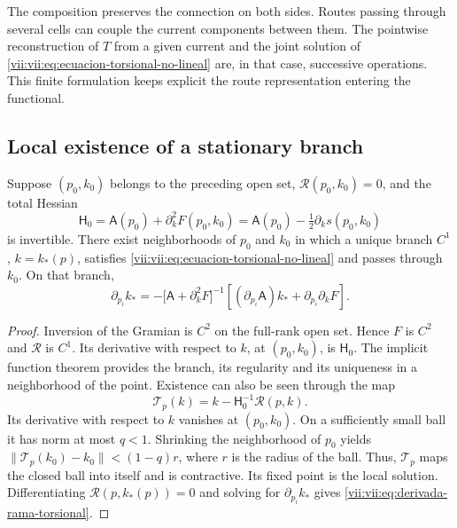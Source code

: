 The composition preserves the connection on both sides. Routes
passing through several cells can couple the current
components between them. The pointwise reconstruction of \(T\) from
a given current and the joint solution of
\eqref{vii:vii:eq:ecuacion-torsional-no-lineal} are, in that case,
successive operations. This finite formulation keeps explicit
the route representation entering the functional.

\subsection{Local existence of a stationary branch}
\label{vii:vii:subsec:rama-torsional-local}

\begin{theorem}
\label{vii:vii:thm:rama-torsional-local}
Suppose \((p_0,k_0)\) belongs to the preceding open set,
\(\mathcal R(p_0,k_0)=0\), and the total Hessian
\begin{equation}
 \mathsf H_0
 =\mathsf A(p_0)+\partial_k^2F(p_0,k_0)
 =\mathsf A(p_0)-\tfrac12\partial_ks(p_0,k_0)
 \label{vii:vii:eq:hessiano-total-torsional}
\end{equation}
is invertible. There exist neighborhoods of \(p_0\) and \(k_0\) in which
a unique branch \(C^1\), \(k=k_*(p)\), satisfies
\eqref{vii:vii:eq:ecuacion-torsional-no-lineal} and passes through \(k_0\).
On that branch,
\begin{equation}
 \partial_{p_i}k_*
 =-\bigl[\mathsf A+\partial_k^2F\bigr]^{-1}
     \left[(\partial_{p_i}\mathsf A)k_*
                      +\partial_{p_i}\partial_kF\right].
 \label{vii:vii:eq:derivada-rama-torsional}
\end{equation}
\end{theorem}

\begin{proof}
Inversion of the Gramian is \(C^2\) on the full-rank open
set. Hence \(F\) is \(C^2\) and \(\mathcal R\) is
\(C^1\). Its derivative with respect to \(k\), at \((p_0,k_0)\), is
\(\mathsf H_0\). The implicit function theorem provides
the branch, its regularity and its uniqueness in a neighborhood of the point.
Existence can also be seen through the map
\[
 \mathcal T_p(k)=k-\mathsf H_0^{-1}\mathcal R(p,k).
\]
Its derivative with respect to \(k\) vanishes at \((p_0,k_0)\).
On a sufficiently small ball it has norm at most
\(q<1\). Shrinking the neighborhood of \(p_0\) yields
\(\|\mathcal T_p(k_0)-k_0\|<(1-q)r\), where \(r\) is the
radius of the ball. Thus, \(\mathcal T_p\) maps the closed ball
into itself and is contractive. Its fixed point is the local solution.
Differentiating \(\mathcal R(p,k_*(p))=0\) and solving for
\(\partial_{p_i}k_*\) gives
\eqref{vii:vii:eq:derivada-rama-torsional}.
\end{proof}

